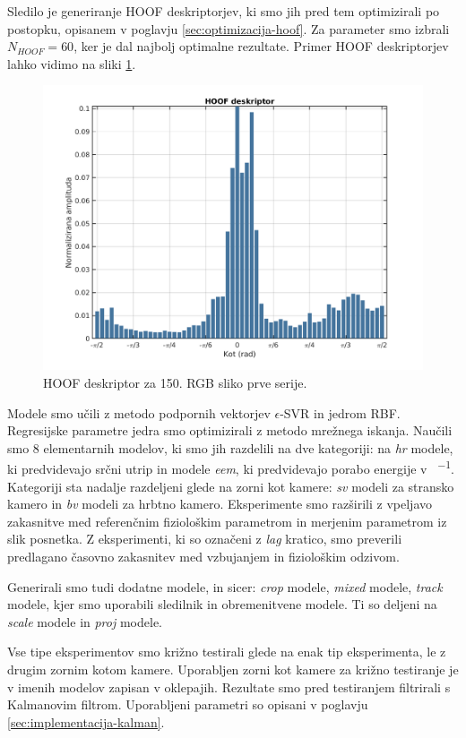 Sledilo je generiranje HOOF deskriptorjev, ki smo jih pred tem optimizirali po postopku, opisanem v poglavju \ref{sec:optimizacija-hoof}. Za parameter smo izbrali $N_{HOOF} = 60 $, ker je dal najbolj optimalne rezultate. Primer HOOF deskriptorjev lahko vidimo na sliki \ref{fig:hoof-znacilke}.

\begin{figure}[htb]
	\centering
	\includegraphics[width=0.75\columnwidth]{./Slike/histogram.png}
	\caption{HOOF deskriptor za 150. RGB sliko prve serije.}
	\label{fig:hoof-znacilke}
\end{figure}

Modele smo učili z metodo podpornih vektorjev $\epsilon$-SVR in jedrom RBF. Regresijske parametre jedra smo optimizirali z metodo mrežnega iskanja. Naučili smo \num{8} elementarnih modelov, ki smo jih razdelili na dve kategoriji: na \textit{hr} modele, ki predvidevajo srčni utrip in modele \textit{eem}, ki predvidevajo porabo energije v \si{\kcal\per\min}. Kategoriji sta nadalje razdeljeni glede na zorni kot kamere: \textit{sv} modeli za stransko kamero in \textit{bv} modeli za hrbtno kamero. Eksperimente smo razširili z vpeljavo zakasnitve med referenčnim fiziološkim parametrom in merjenim parametrom iz slik posnetka. Z eksperimenti, ki so označeni z \textit{lag} kratico, smo preverili predlagano časovno zakasnitev med vzbujanjem in fiziološkim odzivom. 

Generirali smo tudi dodatne modele, in sicer: \textit{crop} modele, \textit{mixed} modele, \textit{track} modele, kjer smo uporabili sledilnik in obremenitvene modele. Ti so deljeni na \textit{scale} modele in \textit{proj} modele.

Vse tipe eksperimentov smo križno testirali glede na enak tip eksperimenta, le z drugim zornim kotom kamere. Uporabljen zorni kot kamere za križno testiranje je v imenih modelov zapisan v oklepajih. Rezultate smo pred testiranjem filtrirali s Kalmanovim filtrom. Uporabljeni parametri so opisani v poglavju \ref{sec:implementacija-kalman}.


